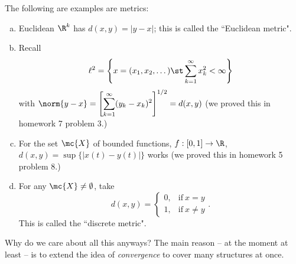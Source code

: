 \begin{example}
	The following are examples are metrics:
	\begin{enumerate}[(a)]
		\item Euclidean \(\R^k\) has \(d(x,y)=|y-x|\); this is called the ``Euclidean metric".
		
		\item Recall
		\begin{equation*}
			\ell^2=\left\{x=(x_1,x_2,\dots)\st\sum_{k=1}^{\infty}x_k^2<\infty\right\}
		\end{equation*}
		with \(\norm{y-x}=\left[\displaystyle\sum_{k=1}^{\infty}(y_k-x_k)^2\right]^{1/2}=d(x,y)\) (we proved this in homework 7 problem 3.)
		
		\item For the set \(\mc{X}\) of bounded functions, \(f:[0,1]\to\R\), \(d(x,y)=\sup\{|x(t)-y(t)|\}\) works (we proved this in homework 5 problem 8.)
		
		\item For any \(\mc{X}\neq\emptyset\), take 
		\begin{equation*}
			d(x,y)=\begin{cases}
					0,&\text{if}~x=y\\
					1,&\text{if}~x\neq y
				   \end{cases}.
		\end{equation*}
		This is called the ``discrete metric".
	\end{enumerate} 
	\begin{reflection}
		Why do we care about all this anyways? The main reason -- at the moment at least -- is to extend the idea of \emph{convergence} to cover many structures at once.
	\end{reflection}
\end{example}